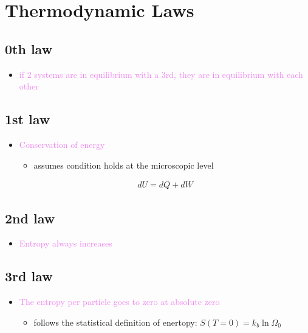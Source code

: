 

\section{Thermodynamic Laws}

\subsection*{0th law}
\begin{itemize}
    \item \textcolor{violet}{if 2 systems are in equilibrium with a 3rd, they are in equilibrium
    with each other}
\end{itemize}


\subsection*{1st law}
\begin{itemize}
    \item \textcolor{violet}{Conservation of energy}
    \begin{itemize}
        \item assumes condition holds at the microscopic level
    \end{itemize}
    \begin{align}
        dU = dQ + dW
    \end{align}
\end{itemize}


\subsection*{2nd law}
\begin{itemize}
    \item \textcolor{violet}{Entropy always increases}
\end{itemize}


\subsection*{3rd law}
\begin{itemize}
    \item \textcolor{violet}{The entropy per particle goes to zero at absolute zero}
    \begin{itemize}
        \item follows the statistical definition of enertopy: $S(T = 0) = k_b \ln \Omega_0$
    \end{itemize}
\end{itemize}
